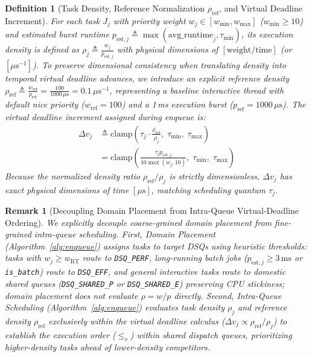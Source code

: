 \documentclass[conference]{IEEEtran}
\newtheorem{definition}{Definition}
\newtheorem{remark}{Remark}
\begin{document}
\begin{definition}[Task Density, Reference Normalization $\rho_{\mathrm{ref}}$, and Virtual Deadline Increment]
\label{def:density_ref}
For each task $J_j$ with priority weight $w_j \in [w_{\min}, w_{\max}]$ ($w_{\min} \ge 10$) and estimated burst runtime $p_{\mathrm{est},j} \triangleq \max(\mathrm{avg\_runtime}_j, \tau_{\min})$, its execution density is defined as $\rho_j \triangleq \frac{w_j}{p_{\mathrm{est},j}}$ with physical dimensions of $[\mathrm{weight}/\mathrm{time}]$ (or $[\mu\mathrm{s}^{-1}]$). To preserve dimensional consistency when translating density into temporal virtual deadline advances, we introduce an explicit reference density $\rho_{\mathrm{ref}} \triangleq \frac{w_{\mathrm{ref}}}{p_{\mathrm{ref}}} = \frac{100}{1000\,\mu\mathrm{s}} = 0.1\,\mu\mathrm{s}^{-1}$, representing a baseline interactive thread with default nice priority ($w_{\mathrm{ref}} = 100$) and a 1\,ms execution burst ($p_{\mathrm{ref}} = 1000\,\mu\mathrm{s}$). The virtual deadline increment assigned during enqueue is:
\begin{align}
\label{eq:delta_v_formula}
\Delta v_j &\triangleq \mathrm{clamp}\left( \tau_j \cdot \frac{\rho_{\mathrm{ref}}}{\rho_j}, \; \tau_{\min}, \; \tau_{\max} \right) \nonumber \\
&= \mathrm{clamp}\left( \frac{\tau_j p_{\mathrm{est},j}}{10 \max(w_j, 10)}, \; \tau_{\min}, \; \tau_{\max} \right)
\end{align}
Because the normalized density ratio $\rho_{\mathrm{ref}} / \rho_j$ is strictly dimensionless, $\Delta v_j$ has exact physical dimensions of time $[\mu\mathrm{s}]$, matching scheduling quantum $\tau_j$.
\end{definition}

\begin{remark}[Decoupling Domain Placement from Intra-Queue Virtual-Deadline Ordering]
\label{rem:domain_vs_density}
We explicitly decouple coarse-grained domain placement from fine-grained intra-queue scheduling. First, \emph{Domain Placement (Algorithm~\ref{alg:enqueue})} assigns tasks to target DSQs using heuristic thresholds: tasks with $w_j \ge w_{\mathrm{RT}}$ route to \texttt{DSQ\_PERF}, long-running batch jobs ($p_{\mathrm{est},j} \ge 3\,\mathrm{ms}$ or \texttt{is\_batch}) route to \texttt{DSQ\_EFF}, and general interactive tasks route to domestic shared queues (\texttt{DSQ\_SHARED\_P} or \texttt{DSQ\_SHARED\_E}) preserving CPU stickiness; domain placement does not evaluate $\rho = w/p$ directly. Second, \emph{Intra-Queue Scheduling (Algorithm~\ref{alg:enqueue})} evaluates task density $\rho_j$ and reference density $\rho_{\mathrm{ref}}$ exclusively within the virtual deadline calculus ($\Delta v_j \propto \rho_{\mathrm{ref}}/\rho_j$) to establish the execution order ($\le_v$) within shared dispatch queues, prioritizing higher-density tasks ahead of lower-density competitors.
\end{remark}
\end{document}

